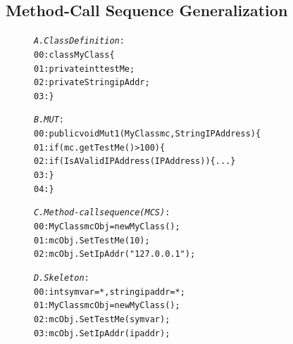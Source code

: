 \documentclass{sig-alternate}
\begin{document}
\subsection{Method-Call Sequence Generalization}

\begin{figure}[t]
\begin{CodeOut}
\begin{alltt}

\emph{A. Class Definition}:
00:class MyClass \{ 
01:\hspace*{0.1in}private int testMe;	
02:\hspace*{0.1in}private String ipAddr;	
03:\}

\emph{B. MUT}:
00:public void Mut1(MyClass mc, String IPAddress) \{
01:\hspace*{0.1in}if(mc.getTestMe() > 100) \{ 
02:\hspace*{0.2in}if(IsAValidIPAddress(IPAddress)) \{ ... \}
03:\hspace*{0.1in}\}
04:\}

\emph{C. Method-call sequence (MCS)}:
00:MyClass mcObj = new MyClass();
01:mcObj.SetTestMe(10);
02:mcObj.SetIpAddr("127.0.0.1");

\emph{D. Skeleton}:
00:int symvar = *, string ipaddr = *; 
01:MyClass mcObj = new MyClass();
02:mcObj.SetTestMe(symvar);
03:mcObj.SetIpAddr(ipaddr);

\end{alltt}
\end{CodeOut}\vspace*{-5ex}
\vspace*{-3ex}
\end{figure}

\end{document}
